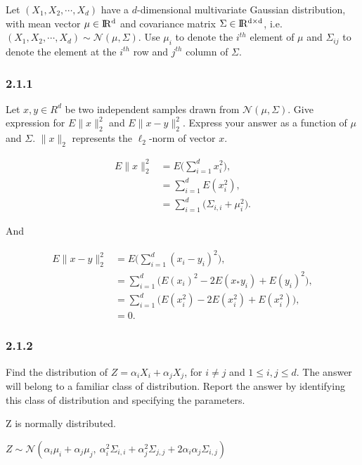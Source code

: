\documentclass[11pt]{article}
\begin{document}
    Let \((X_1, X_2, \cdots, X_d)\) have a \(d\)-dimensional multivariate
Gaussian distribution, with mean vector \(\mu \in \rm I\!R^d\) and
covariance matrix \(\Sigma \in \rm I\!R^{d \times d}\), i.e.
\((X_1, X_2, \cdots, X_d)\sim \mathcal{N} (\mu, \Sigma)\). Use \(\mu_i\)
to denote the \(i^{th}\) element of \(\mu\) and \(\Sigma_{ij}\) to
denote the element at the \(i^{th}\) row and \(j^{th}\) column of
\(\Sigma\).

    \subsubsection{2.1.1}\label{section}

Let \(x, y \in \!R^d\) be two independent samples drawn from
\(\mathcal{N} (\mu, \Sigma)\). Give expression for \(E \|x\|_2^2\) and
\(E \|x-y\|_2^2\). Express your answer as a function of \(\mu\) and
\(\Sigma\). \(\|x\|_2\) represents the \(\ell_2\)-norm of vector \(x\).

    \begin{align}
E \|x\|_2^2 &= E\bigg(\sum_{i=1}^{d} x_i^2\bigg),\\
 &= \sum_{i=1}^{d} E (x_i^2),\\
 &= \sum_{i=1}^{d} \big( \Sigma_{i,i} + \mu_i^2 \big).
\end{align}

And

\begin{align}
E \|x-y\|_2^2 &= E \bigg( \sum_{i=1}^{d} (x_i-y_i)^2 \bigg),\\
&= \sum_{i=1}^{d} \bigg( E(x_i)^2 - 2E(x_*y_i) + E(y_i)^2 \bigg),\\
&= \sum_{i=1}^{d} \bigg( E(x_i^2) - 2E(x_i^2) + E(x_i^2) \bigg),\\
&= 0.
\end{align}

    \subsubsection{2.1.2}\label{section}

Find the distribution of \(Z = \alpha_i X_i + \alpha_j X_j\), for
\(i\neq j\) and \(1 \leq i, j \leq d\). The answer will belong to a
familiar class of distribution. Report the answer by identifying this
class of distribution and specifying the parameters.

    Z is normally distributed.

\(Z \sim \mathcal{N} (\alpha_i \mu_i + \alpha_j \mu_j,\ \alpha_i^2\Sigma_{i,i} + \alpha_j^2\Sigma_{j,j} + 2\alpha_i\alpha_j\Sigma_{i,j})\)
\end{document}
